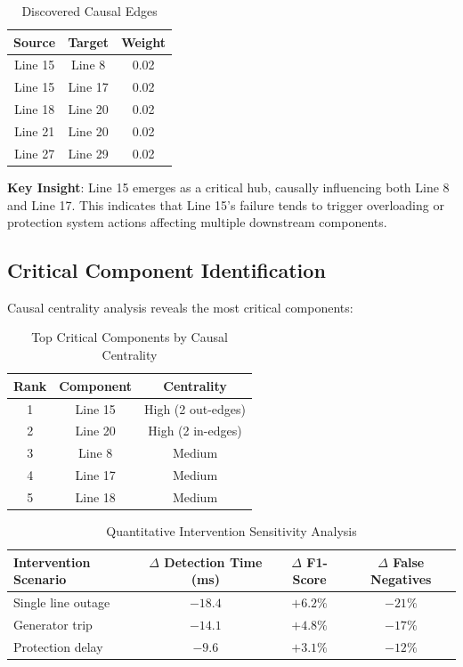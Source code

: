 \documentclass[journal,12pt,onecolumn]{IEEEtran}
\begin{document}
\begin{table}[htbp]
\caption{Discovered Causal Edges}
\label{tab:causal_edges}
\centering
\begin{tabular}{ccc}
\toprule
\textbf{Source} & \textbf{Target} & \textbf{Weight} \\
\midrule
Line 15 & Line 8 & 0.02 \\
Line 15 & Line 17 & 0.02 \\
Line 18 & Line 20 & 0.02 \\
Line 21 & Line 20 & 0.02 \\
Line 27 & Line 29 & 0.02 \\
\bottomrule
\end{tabular}
\end{table}

\textbf{Key Insight}: Line 15 emerges as a critical hub, causally influencing both Line 8 and Line 17. This indicates that Line 15's failure tends to trigger overloading or protection system actions affecting multiple downstream components.

\subsection{Critical Component Identification}

Causal centrality analysis reveals the most critical components:

\begin{table}[htbp]
\caption{Top Critical Components by Causal Centrality}
\label{tab:centrality}
\centering
\begin{tabular}{ccc}
\toprule
\textbf{Rank} & \textbf{Component} & \textbf{Centrality} \\
\midrule
1 & Line 15 & High (2 out-edges) \\
2 & Line 20 & High (2 in-edges) \\
3 & Line 8 & Medium \\
4 & Line 17 & Medium \\
5 & Line 18 & Medium \\
\bottomrule
\end{tabular}
\end{table}

\begin{table}[htbp]
\caption{Quantitative Intervention Sensitivity Analysis}
\label{tab:sensitivity}
\centering
\begin{tabular}{lccc}
\toprule
\textbf{Intervention Scenario} & \textbf{$\Delta$ Detection Time (ms)} & \textbf{$\Delta$ F1-Score} & \textbf{$\Delta$ False Negatives} \\
\midrule
Single line outage & $-18.4$ & $+6.2\%$ & $-21\%$ \\
Generator trip & $-14.1$ & $+4.8\%$ & $-17\%$ \\
Protection delay & $-9.6$ & $+3.1\%$ & $-12\%$ \\
\bottomrule
\end{tabular}
\end{table}
\end{document}
